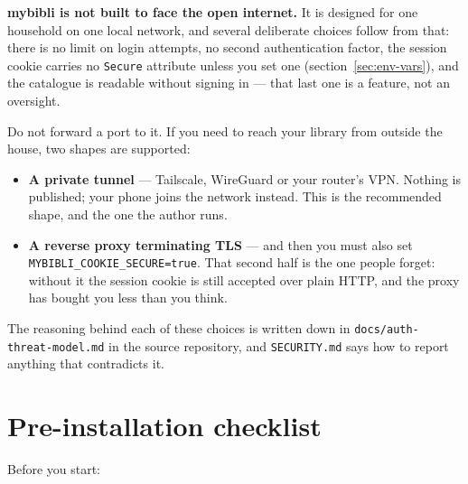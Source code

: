 \begin{warning}
\textbf{mybibli is not built to face the open
internet.} It is designed for one
household on one local network, and several deliberate choices follow
from that: there is no limit on login attempts, no second
authentication factor, the session cookie carries no \texttt{Secure}
attribute unless you set one (section~\ref{sec:env-vars}), and the
catalogue is readable without signing in --- that last one is a
feature, not an oversight.

Do not forward a port to it. If you need to reach your library from
outside the house, two shapes are supported:

\begin{itemize}
  \item \textbf{A private tunnel} --- Tailscale, WireGuard or your
        router's VPN. Nothing is published; your phone joins the
        network instead. This is the recommended shape, and the one
        the author runs.
  \item \textbf{A reverse proxy terminating TLS} --- and then you
        must also set \texttt{MYBIBLI\_COOKIE\_SECURE=true}. That
        second half is the one people forget: without it the session
        cookie is still accepted over plain HTTP, and the proxy has
        bought you less than you think.
\end{itemize}

The reasoning behind each of these choices is written down in
\texttt{docs/auth-threat-model.md} in the source repository, and
\texttt{SECURITY.md} says how to report anything that contradicts it.
\end{warning}

\section{Pre-installation checklist}

Before you start:

